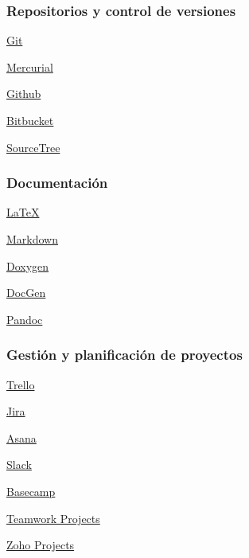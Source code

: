 \subsubsection{Repositorios y control de versiones}
\begin{multicols}{2}
\begin{compactitem}
\item \href{https://git-scm.com/}{Git}
\item \href{https://www.mercurial-scm.org/}{Mercurial}
\item \href{https://github.com/}{Github}
\item \href{https://bitbucket.org/}{Bitbucket}
\item \href{https://www.sourcetreeapp.com/}{SourceTree}
\end{compactitem}
\end{multicols}


\subsubsection{Documentación}
\begin{multicols}{2}
\begin{compactitem}
\item \href{https://www.latex-project.org/}{\LaTeX}
\item \href{https://markdown.es/}{Markdown}
\item \href{http://www.stack.nl/\%7Edimitri/doxygen/index.html}{Doxygen}
\item \href{http://mtmacdonald.github.io/docgen/docs/index.html}{DocGen}
\item \href{http://pandoc.org/}{Pandoc}
\end{compactitem}
\end{multicols}



\subsubsection{Gestión y planificación de proyectos}
\begin{multicols}{2}
\begin{compactitem}
\item \href{https://trello.com/}{Trello}
\item \href{https://es.atlassian.com/software/jira}{Jira}
\item \href{https://asana.com/}{Asana}
\item \href{https://slack.com/}{Slack}
\item \href{https://basecamp.com/}{Basecamp}
\item \href{https://www.teamwork.com/project-management-software}{Teamwork Projects}
\item \href{https://www.zoho.com/projects/}{Zoho Projects}
\end{compactitem}
\end{multicols}


